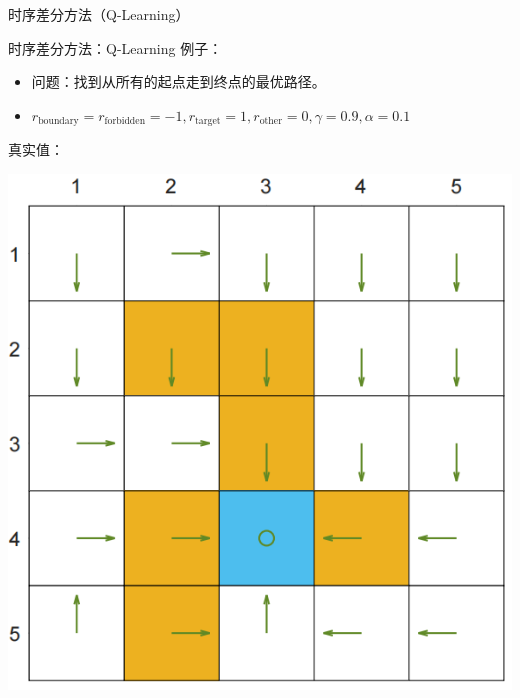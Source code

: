 \begin{section}{时序差分方法\alert{（Q-Learning）}}
\begin{frame}{时序差分方法：Q-Learning}
    例子：
    \begin{itemize}
        \item 问题：找到从\alert{所有的起点}走到终点的最优路径。
        \item $r_{\text{boundary}}=r_{\text{forbidden}}=-1, r_{\text{target}}=1, r_\text{other}=0, \gamma=0.9, \alpha=0.1$
    \end{itemize}
    真实值：
    \begin{center}
        \begin{minipage}{0.3\textwidth}
            \centering
            \includegraphics[width=\linewidth]{assets/OptimalPolicy.jpg}
        \end{minipage}
        \hspace{1cm}
        \begin{minipage}{0.3\textwidth}
            \centering

\end{minipage}
\end{center}
\end{frame}
\end{section}
